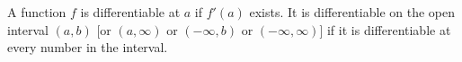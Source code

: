\begin{frame}
\begin{definition}[Differentiable]
A function $f$ is differentiable at $a$ if $f'(a)$ exists.  It is differentiable on the open interval $(a,b)$ [or $(a,\infty)$ or $(-\infty ,b)$ or $(-\infty , \infty )$] if it is differentiable at every number in the interval.
\end{definition}
\end{frame}
